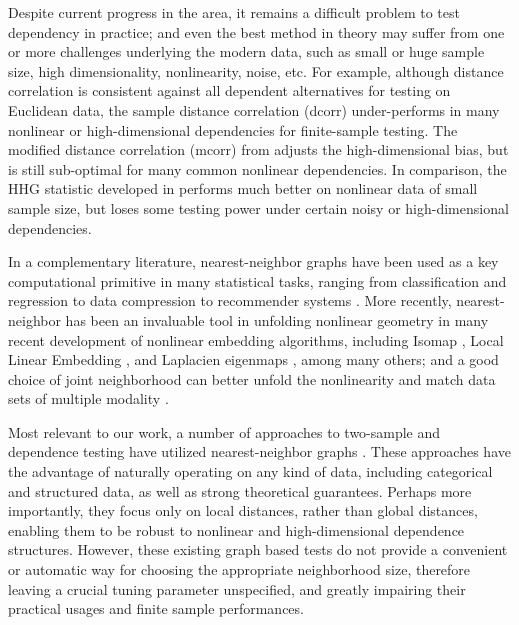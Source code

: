 \documentclass[11pt]{article}
\begin{document}
Despite current progress in the area, it remains a difficult problem to test dependency in practice; and even the best method in theory may suffer from one or more challenges underlying the modern data, such as small or huge sample size, high dimensionality, nonlinearity, noise, etc. For example, although distance correlation is consistent against all dependent alternatives for testing on Euclidean data, the sample distance correlation (dcorr) under-performs in many nonlinear or high-dimensional dependencies for finite-sample testing. The modified distance correlation (mcorr) from \cite{SzekelyRizzo2013a} adjusts the high-dimensional bias, but is still sub-optimal for many common nonlinear dependencies. In comparison, the HHG statistic developed in \cite{HellerGorfine2013} performs much better on nonlinear data of small sample size, but loses some testing power under certain noisy or high-dimensional dependencies. %

In a complementary literature, nearest-neighbor graphs have been used as a key computational primitive in many statistical tasks, ranging from classification and regression \cite{Stone1977} to data compression to recommender systems \cite{Sarwar2000}. 
More recently, nearest-neighbor has been an invaluable tool in unfolding nonlinear geometry in many recent development of nonlinear embedding algorithms, including Isomap \cite{TenenbaumSilvaLangford2000, SilvaTenenbaum2003}, Local Linear Embedding \cite{SaulRoweis2000, RoweisSaul2003}, and Laplacien eigenmaps \cite{BelkinNiyogi2003}, among many others; and a good choice of joint neighborhood can better unfold the nonlinearity and match data sets of multiple modality \cite{ShenVogelsteinPriebe2016}.

Most relevant to our work, a number of approaches to two-sample and dependence testing have utilized nearest-neighbor graphs \cite{David1966,Friedman1983,Schilling1986,Dumcke2014}.  These approaches have the advantage of naturally operating on any kind of data, including categorical and structured data, as well as strong theoretical guarantees.  Perhaps more importantly, they focus only on local distances, rather than global distances, enabling them to be robust to nonlinear and high-dimensional dependence structures.  However, these existing graph based tests do not provide a convenient or automatic way for choosing the appropriate neighborhood size, therefore leaving a crucial tuning parameter unspecified, and greatly impairing their practical usages and finite sample performances. 
\end{document}

